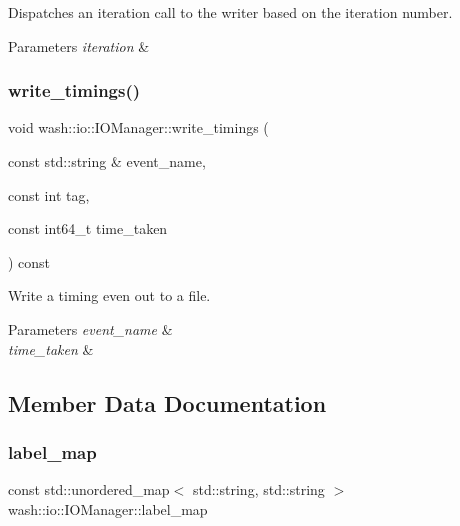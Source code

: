 Dispatches an iteration call to the writer based on the iteration number. 


\begin{DoxyParams}{Parameters}
{\em iteration} & \\
\hline
\end{DoxyParams}
\mbox{\label{classwash_1_1io_1_1IOManager_ab2397361f7dc4f7b54b559d332bafb11}} 
\subsubsection{\texorpdfstring{write\+\_\+timings()}{write\_timings()}}
{\footnotesize\ttfamily void wash\+::io\+::\+I\+O\+Manager\+::write\+\_\+timings (\begin{DoxyParamCaption}\item[{const std\+::string \&}]{event\+\_\+name,  }\item[{const int}]{tag,  }\item[{const int64\+\_\+t}]{time\+\_\+taken }\end{DoxyParamCaption}) const\hspace{0.3cm}{\ttfamily [inline]}}



Write a timing even out to a file. 


\begin{DoxyParams}{Parameters}
{\em event\+\_\+name} & \\
\hline
{\em time\+\_\+taken} & \\
\hline
\end{DoxyParams}


\subsection{Member Data Documentation}
\mbox{\label{classwash_1_1io_1_1IOManager_ae2918fb006b6571b0eeceed90d2685b4}} 
\subsubsection{\texorpdfstring{label\+\_\+map}{label\_map}}
{\footnotesize\ttfamily const std\+::unordered\+\_\+map$<$ std\+::string, std\+::string $>$ wash\+::io\+::\+I\+O\+Manager\+::label\+\_\+map\hspace{0.3cm}{\ttfamily [static]}}


